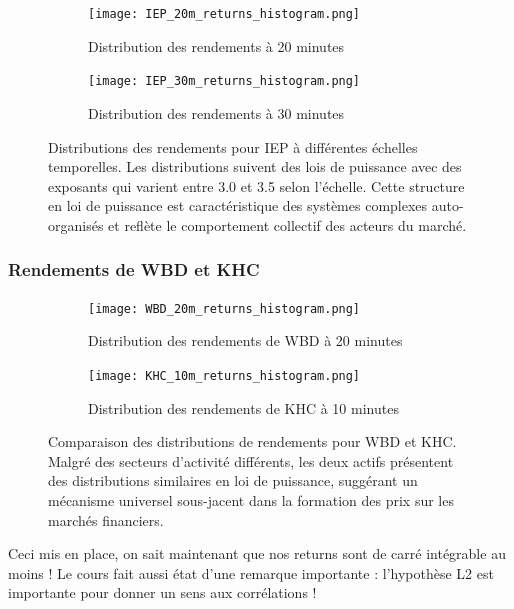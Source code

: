 \documentclass[10pt,a4paper]{article}
\theoremstyle{definition}
\theoremstyle{remark}
\begin{document}
\begin{itemize}
\begin{figure}[H]
    \vspace{0.5cm}
    
    \begin{subfigure}[b]{0.45\textwidth}
        \texttt{[image: IEP\_20m\_returns\_histogram.png]}
        \caption{Distribution des rendements à 20 minutes}
        \label{fig:IEP_20m_moved}
    \end{subfigure}
    \hfill
    \begin{subfigure}[b]{0.45\textwidth}
        \texttt{[image: IEP\_30m\_returns\_histogram.png]}
        \caption{Distribution des rendements à 30 minutes}
        \label{fig:IEP_30m_moved}
    \end{subfigure}
    \caption{Distributions des rendements pour IEP à différentes échelles temporelles. Les distributions suivent des lois de puissance avec des exposants qui varient entre 3.0 et 3.5 selon l'échelle. Cette structure en loi de puissance est caractéristique des systèmes complexes auto-organisés et reflète le comportement collectif des acteurs du marché.}
    \label{fig:IEP_multi_scale_moved}
\end{figure}

\subsubsection{Rendements de WBD et KHC}

\begin{figure}[H]
    \centering
    \begin{subfigure}[b]{0.45\textwidth}
        \texttt{[image: WBD\_20m\_returns\_histogram.png]}
        \caption{Distribution des rendements de WBD à 20 minutes}
        \label{fig:WBD_20m_moved}
    \end{subfigure}
    \hfill
    \begin{subfigure}[b]{0.45\textwidth}
        \texttt{[image: KHC\_10m\_returns\_histogram.png]}
        \caption{Distribution des rendements de KHC à 10 minutes}
        \label{fig:KHC_10m_moved}
    \end{subfigure}
    \caption{Comparaison des distributions de rendements pour WBD et KHC. Malgré des secteurs d'activité différents, les deux actifs présentent des distributions similaires en loi de puissance, suggérant un mécanisme universel sous-jacent dans la formation des prix sur les marchés financiers.}
    \label{fig:WBD_KHC_returns_moved}
\end{figure}


Ceci mis en place, on sait maintenant que nos returns sont de carré intégrable au moins ! 
Le cours fait aussi état d'une remarque importante : l'hypothèse L2 est importante pour donner un sens aux corrélations !


\end{itemize}
\end{document}

